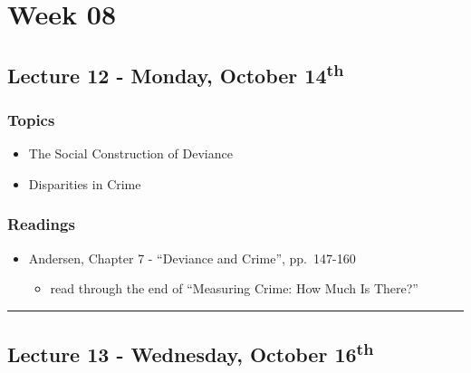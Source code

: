 \documentclass[]{book}
\providecommand{\tightlist}{%
  \setlength{\itemsep}{0pt}\setlength{\parskip}{0pt}}
\begin{document}
\hypertarget{week-08}{%
\section*{Week 08}\label{week-08}}

\hypertarget{lecture-12---monday-october-14th}{%
\subsection*{\texorpdfstring{Lecture 12 - Monday, October 14\textsuperscript{th}}{Lecture 12 - Monday, October 14th}}\label{lecture-12---monday-october-14th}}

\hypertarget{topics-14}{%
\subsubsection*{Topics}\label{topics-14}}

\begin{itemize}
\tightlist
\item
  The Social Construction of Deviance
\item
  Disparities in Crime
\end{itemize}

\hypertarget{readings-13}{%
\subsubsection*{Readings}\label{readings-13}}

\begin{itemize}
\tightlist
\item
  Andersen, Chapter 7 - ``Deviance and Crime'', pp.~147-160

  \begin{itemize}
  \tightlist
  \item
    read through the end of ``Measuring Crime: How Much Is There?''
  \end{itemize}
\end{itemize}

\begin{center}\rule{0.5\linewidth}{\linethickness}\end{center}

\hypertarget{lecture-13---wednesday-october-16th}{%
\subsection*{\texorpdfstring{Lecture 13 - Wednesday, October 16\textsuperscript{th}}{Lecture 13 - Wednesday, October 16th}}\label{lecture-13---wednesday-october-16th}}
\end{document}
